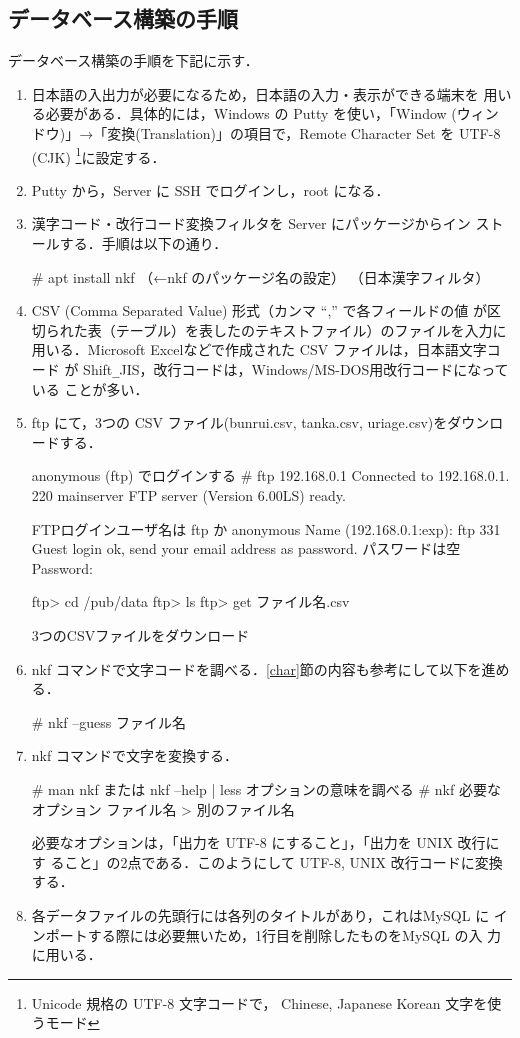 \subsection{データベース構築の手順}
データベース構築の手順を下記に示す．
\begin{enumerate}
 \item 日本語の入出力が必要になるため，日本語の入力・表示ができる端末を
       用いる必要がある．具体的には，Windows の Putty を使い，「Window
       (ウィンドウ)」→「変換(Translation)」の項目で，Remote Character
       Set を UTF-8 (CJK) \footnote{Unicode 規格の UTF-8 文字コードで，
       Chinese, Japanese Korean 文字を使うモード}に設定する．
 \item Putty から，Server に SSH でログインし，root になる．
 \item 漢字コード・改行コード変換フィルタを Server にパッケージからイン
       ストールする．手順は以下の通り．
\begin{cli}
# apt install nkf  （←nkf のパッケージ名の設定）
    （日本漢字フィルタ）
\end{cli}
 \item CSV (Comma Separated Value) 形式（カンマ ``,'' で各フィールドの値
が区切られた表（テーブル）を表したのテキストファイル）のファイルを入力に
用いる．Microsoft Excelなどで作成された CSV ファイルは，日本語文字コード
が Shift\verb+_+JIS，改行コードは，Windows/MS-DOS用改行コードになっている
ことが多い．
 \item ftp にて，3つの CSV ファイル(bunrui.csv, tanka.csv, uriage.csv)をダウンロードする．
\begin{cli}
anonymous (ftp) でログインする
# ftp 192.168.0.1
   Connected to 192.168.0.1.
   220 mainserver FTP server (Version 6.00LS) ready.

FTPログインユーザ名は ftp か anonymous
Name (192.168.0.1:exp): ftp
   331 Guest login ok, send your email address as password.
パスワードは空
Password:

ftp> cd /pub/data
ftp> ls
ftp> get ファイル名.csv

3つのCSVファイルをダウンロード
\end{cli}
 \item nkf コマンドで文字コードを調べる．\ref{char}節の内容も参考にして以下を進める．
\begin{cli}
# nkf --guess ファイル名
\end{cli}
 \item nkf コマンドで文字を変換する．
\begin{cli}
# man nkf または nkf --help  | less
    オプションの意味を調べる
# nkf 必要なオプション ファイル名 > 別のファイル名
\end{cli}
必要なオプションは，「出力を UTF-8 にすること」，「出力を UNIX 改行にす
       ること」の2点である．このようにして UTF-8, UNIX 改行コードに変換
       する．
 \item 各データファイルの先頭行には各列のタイトルがあり，これはMySQL に
       インポートする際には必要無いため，1行目を削除したものをMySQL の入
       力に用いる．
\end{enumerate}

